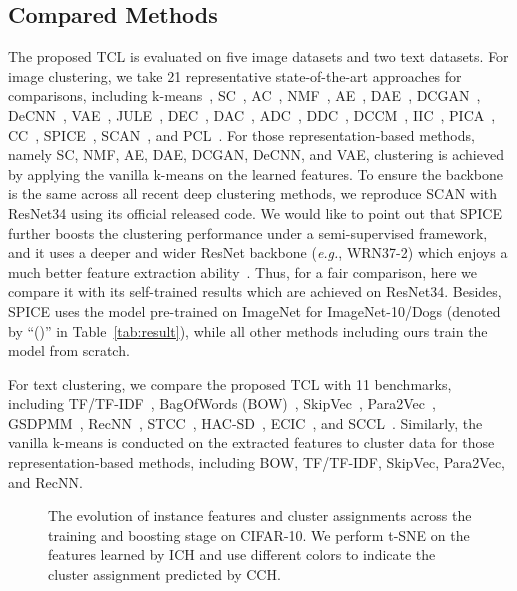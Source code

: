 \subsection{Compared Methods}

The proposed TCL is evaluated on five image datasets and two text datasets. For image clustering, we take 21 representative state-of-the-art approaches for comparisons, including k-means~\citep{Kmeans}, SC~\citep{SC}, AC~\citep{AC}, NMF~\citep{NMF}, AE~\citep{AE}, DAE~\citep{DAE}, DCGAN~\citep{DCGAN}, DeCNN~\citep{DeCNN}, VAE~\citep{VAE}, JULE~\citep{JULE}, DEC~\citep{DEC}, DAC~\citep{DAC}, ADC~\citep{ADC}, DDC~\citep{DDC}, DCCM~\citep{DCCM}, IIC~\citep{IIC}, PICA~\citep{PICA}, CC~\citep{CC}, SPICE~\citep{SPICE}, SCAN~\citep{SCAN}, and PCL~\citep{li2020prototypical}. For those representation-based methods, namely SC, NMF, AE, DAE, DCGAN, DeCNN, and VAE, clustering is achieved by applying the vanilla k-means on the learned features. To ensure the backbone is the same across all recent deep clustering methods, we reproduce SCAN with ResNet34 using its official released code. We would like to point out that SPICE further boosts the clustering performance under a semi-supervised framework, and it uses a deeper and wider ResNet backbone (\textit{e.g.}, WRN37-2) which enjoys a much better feature extraction ability~\citep{SimCLRv2}. Thus, for a fair comparison, here we compare it with its self-trained results which are achieved on ResNet34. Besides, SPICE uses the model pre-trained on ImageNet for ImageNet-10/Dogs (denoted by ``()'' in Table~\ref{tab:result}), while all other methods including ours train the model from scratch.

For text clustering, we compare the proposed TCL with 11 benchmarks, including TF/TF-IDF~\citep{TFIDF}, BagOfWords (BOW)~\citep{BOW}, SkipVec~\citep{SkipVec}, Para2Vec~\citep{Para2Vec}, GSDPMM~\citep{GSDPMM}, RecNN~\citep{ReCNN}, STCC~\citep{STCC}, HAC-SD~\citep{ECIC}, ECIC~\citep{ECIC}, and SCCL~\citep{SCCL}. Similarly, the vanilla k-means is conducted on the extracted features to cluster data for those representation-based methods, including BOW, TF/TF-IDF, SkipVec, Para2Vec, and RecNN.

\begin{figure*}[t]\centering
  \subfigure[0 epoch (NMI=0.152)]{
    \texttt{[image: Figures/TSNE\_Epoch=0\_CIFAR10]}}
  \subfigure[200 epoch (NMI=0.699)]{
    \texttt{[image: Figures/TSNE\_Epoch=200\_CIFAR10]}}
  \subfigure[1000 epoch (NMI=0.790)]{
    \texttt{[image: Figures/TSNE\_Epoch=1000\_CIFAR10]}}
  \subfigure[1200 epoch (NMI=0.819)]{
    \texttt{[image: Figures/TSNE\_Epoch=1200\_CIFAR10]}}
  \caption{The evolution of instance features and cluster assignments across the training and boosting stage on CIFAR-10. We perform t-SNE on the features learned by ICH and use different colors to indicate the cluster assignment predicted by CCH.}\label{fig:tsne}
\end{figure*}

